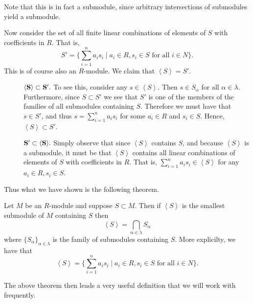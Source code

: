 \documentclass[12pt,letterpaper]{algebra_book}
\theoremstyle{definition}
\begin{document}
Note that this is in fact a submodule,
since arbitrary intersections of submodules yield a submodule. 

Now consider the set of all finite linear combinations of elements
of $S$ with coefficients in $R$. That is, 
\[
    S' = \Big\{\sum_{i = 1}^{n} a_is_i \mid a_i \in R, s_i \in S \text{ for all } i \in N\Big\}. 
\]
This is of course also an $R$-module. We claim that $\left< S
\right> = S'$.
\begin{description}
    \item[\phantom{meow}]$\bf{\left< S \right> \subset S'.}$ To
    see this, consider any $s \in \left<S\right>$. Then $s \in
    S_{\alpha}$ for all $\alpha \in \lambda$. Furthermore, since
    $S \subset S'$ we see that $S'$ is one of the members of the
    families of all submodules containing $S$. Therefore we must
    have that $s \in S'$, and thus $\displaystyle s = \sum_{i = 1}^{n}a_is_i$
    for some $a_i \in R$ and $s_i \in S$. Hence, $\left<S
    \right> \subset S'$.
    
    \item[\phantom{meow}]$\bf{S' \subset \left< S \right>}.$
    Simply observe that since $\left< S \right>$ contains $S$, and
    because $\left< S \right>$ is a submodule,
    it must be that $\left< S \right>$ contains all linear combinations of
    elements of $S$ with coefficients in $R$. That is,
    $\displaystyle \sum_{i = 1}^{n} a_is_i \in \left< S \right>$
    for any $a_i \in R, s_i \in S$. 
\end{description}

Thus what we have shown is the following theorem. 
\begin{thm}\label{submodule_intersection_theorem}
    Let $M$ be an $R$-module and suppose $S \subset M$. Then if
    $\left< S \right>$ is the smallest submodule of $M$ containing
    $S$ then 
    \[
        \left< S \right> = \bigcap_{\alpha \in \lambda} S_\alpha
    \]
    where $\{S_\alpha\}_{\alpha \in \lambda}$ is the family of
    submodules containing $S$. More explicilty, we have that 
    \[
        \left< S \right> = \Big\{\sum_{i = 1}^{n} a_is_i \mid a_i \in R, s_i \in S \text{ for all } i \in N\Big\}.
    \]
    \vspace{-0.7cm}
\end{thm}

The above theorem then leads a very useful definition that we will
work with frequently. 
\end{document}
